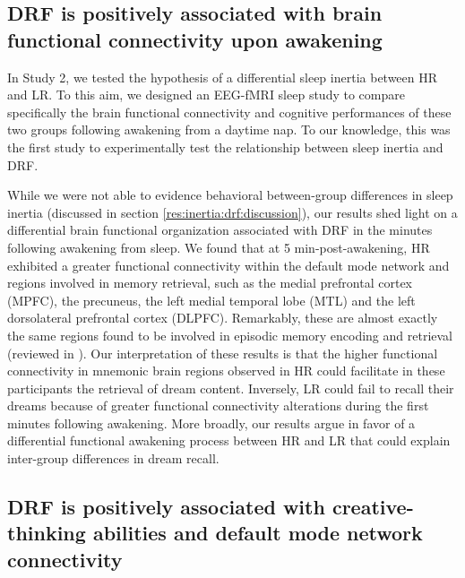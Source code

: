 \subsection{DRF is positively associated with brain functional connectivity upon awakening}
\label{disc:drf:summary:inertia}

In Study 2, we tested the hypothesis of a differential sleep inertia between HR and LR. To this aim, we designed an EEG-fMRI sleep study to compare specifically the brain functional connectivity and cognitive performances of these two groups following awakening from a daytime nap. To our knowledge, this was the first study to experimentally test the relationship between sleep inertia and DRF.

While we were not able to evidence behavioral between-group differences in sleep inertia (discussed in section \ref{res:inertia:drf:discussion}), our results shed light on a differential brain functional organization associated with DRF in the minutes following awakening from sleep. We found that at 5 min-post-awakening, HR exhibited a greater functional connectivity within the default mode network and regions involved in memory retrieval, such as the medial prefrontal cortex (MPFC), the precuneus, the left medial temporal lobe (MTL) and the left dorsolateral prefrontal cortex (DLPFC). Remarkably, these are almost exactly the same regions found to be involved in episodic memory encoding and retrieval (reviewed in \citealp{spaniol_event-related_2009}). Our interpretation of these results is that the higher functional connectivity in mnemonic brain regions observed in HR could facilitate in these participants the retrieval of dream content. Inversely, LR could fail to recall their dreams because of greater functional connectivity alterations during the first minutes following awakening. More broadly, our results argue in favor of a differential functional awakening process between HR and LR that could explain inter-group differences in dream recall.

\subsection{DRF is positively associated with creative-thinking abilities and default mode network connectivity}
\label{disc:drf:summary:dmn}

